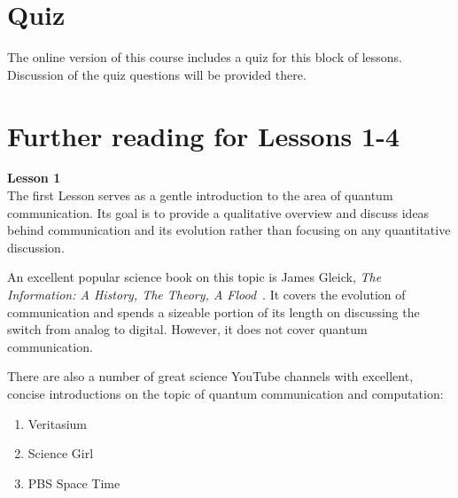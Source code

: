 \newpage
\begin{exercises}


\end{exercises}


\newpage
\section{Quiz}


The online version of this course includes a quiz for this block of lessons. Discussion of the quiz questions will be provided there.

\section{Further reading for Lessons 1-4}

{\bf Lesson 1}\\

The first Lesson serves as a gentle introduction to the area of quantum communication. Its goal is to provide a qualitative overview and discuss ideas behind communication and its evolution rather than focusing on any quantitative discussion.

An excellent popular science book on this topic is James Gleick, \emph{The Information: A History, The Theory, A Flood}~\cite{gleick2012information}. It covers the evolution of communication and spends a sizeable portion of its length on discussing the switch from analog to digital. However, it does not cover quantum communication.

There are also a number of great science YouTube channels with excellent, concise introductions on the topic of quantum communication and computation:
\begin{enumerate}
    \item Veritasium
    \item Science Girl
    \item PBS Space Time
\end{enumerate}

